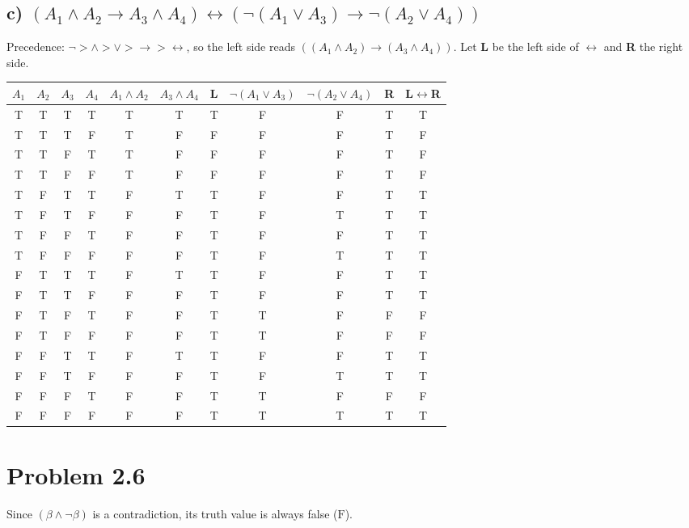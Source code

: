 \documentclass[12pt]{article}
\newcommand{\T}{\cellcolor{truegreen}T}
\newcommand{\F}{\cellcolor{falsered}F}
\begin{document}
\subsection*{c) $(A_1\wedge A_2\to A_3\wedge A_4)\longleftrightarrow(\neg(A_1\vee A_3)\to\neg(A_2\vee A_4))$}
\noindent Precedence: $\neg > \wedge > \vee > \to > \leftrightarrow$, so the left side reads
$((A_1\wedge A_2)\to(A_3\wedge A_4))$. Let \textbf{L} be the left side of $\leftrightarrow$ and \textbf{R} the right side.
\begin{center}
\renewcommand{\arraystretch}{1.15}
\begin{tabular}{|c|c|c|c|c|c|c|c|c|c||c|}
\hline
$A_1$ & $A_2$ & $A_3$ & $A_4$ & $A_1\wedge A_2$ & $A_3\wedge A_4$ & \textbf{L} & $\neg(A_1\vee A_3)$ & $\neg(A_2\vee A_4)$ & \textbf{R} & \textbf{L}$\leftrightarrow$\textbf{R} \\ \hline
\T & \T & \T & \T & \T & \T & \T & \F & \F & \T & \T \\
\T & \T & \T & \F & \T & \F & \F & \F & \F & \T & \F \\
\T & \T & \F & \T & \T & \F & \F & \F & \F & \T & \F \\
\T & \T & \F & \F & \T & \F & \F & \F & \F & \T & \F \\
\T & \F & \T & \T & \F & \T & \T & \F & \F & \T & \T \\
\T & \F & \T & \F & \F & \F & \T & \F & \T & \T & \T \\
\T & \F & \F & \T & \F & \F & \T & \F & \F & \T & \T \\
\T & \F & \F & \F & \F & \F & \T & \F & \T & \T & \T \\
\F & \T & \T & \T & \F & \T & \T & \F & \F & \T & \T \\
\F & \T & \T & \F & \F & \F & \T & \F & \F & \T & \T \\
\F & \T & \F & \T & \F & \F & \T & \T & \F & \F & \F \\
\F & \T & \F & \F & \F & \F & \T & \T & \F & \F & \F \\
\F & \F & \T & \T & \F & \T & \T & \F & \F & \T & \T \\
\F & \F & \T & \F & \F & \F & \T & \F & \T & \T & \T \\
\F & \F & \F & \T & \F & \F & \T & \T & \F & \F & \F \\
\F & \F & \F & \F & \F & \F & \T & \T & \T & \T & \T \\
\hline
\end{tabular}
\end{center}
\section*{Problem 2.6}
Since $(\beta \land \neg\beta)$ is a contradiction, its truth value is always false ($\text{F}$).
\end{document}
